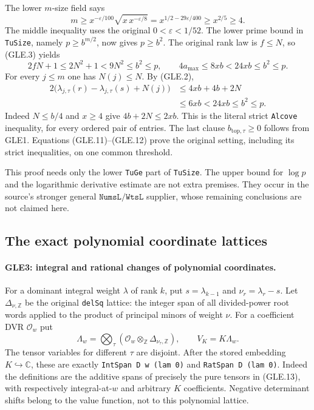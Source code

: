 The lower $m$-size field says
\[
 m\ge x^{-\varepsilon/100}\sqrt{x\,x^{-\varepsilon/8}}
   =x^{1/2-29\varepsilon/400}\ge x^{2/5}\ge4.
 \tag{GLE.10}
\]
The middle inequality uses the original $0<\varepsilon<1/52$.
The lower prime bound in \texttt{TuSize}, namely
$p\ge b^{m/2}$, now gives $p\ge b^2$.
The original rank law is $f\le N$, so (GLE.3) yields
\[
 2fN+1\le2N^2+1<9N^2\le b^2\le p,
 \qquad 4a_{\max}\le8xb<24xb\le b^2\le p.
 \tag{GLE.11}
\]
For every $j\le m$ one has $N(j)\le N$.  By (GLE.2),
\[
 \begin{split}
 2\bigl(\lambda_{j,\tau}(r)-\lambda_{j,\tau}(s)+N(j)\bigr)
 &\le4xb+4b+2N\\
 &\le6xb<24xb\le b^2\le p.
 \end{split}                                      \tag{GLE.12}
\]
Indeed $N\le b/4$ and $x\ge4$ give $4b+2N\le2xb$.
This is the literal strict \texttt{Alcove} inequality, for every ordered
pair of entries.  The last clause $b_{\mathrm{top},\tau}\ge0$ follows
from GLE1.  Equations (GLE.11)--(GLE.12) prove the original setting,
including its strict inequalities, on one common threshold.

This proof needs only the lower \texttt{TuGe} part of \texttt{TuSize}.
The upper bound for $\log p$ and the logarithmic derivative estimate
are not extra premises.  They occur in the source's stronger general
$\texttt{NumsL}/\texttt{WtsL}$ supplier, whose remaining conclusions
are not claimed here.

\subsection{The exact polynomial coordinate lattices}

\paragraph{GLE3: integral and rational changes of polynomial coordinates.}
\label{claim:GLE3}
For a dominant integral weight $\lambda$ of rank $k$, put
$s=\lambda_{k-1}$ and $\nu_r=\lambda_r-s$.  Let
$\Delta_{\nu,\mathbb Z}$ be the original \texttt{delSq} lattice: the
integer span of all divided-power root words applied to the product of
principal minors of weight $\nu$.  For a coefficient DVR $\mathcal O_w$
put
\[
 \Lambda_w=\bigotimes_\tau
       (\mathcal O_w\otimes_{\mathbb Z}\Delta_{\nu_\tau,\mathbb Z}),
 \qquad V_K=K\Lambda_w.
 \tag{GLE.13}
\]
The tensor variables for different $\tau$ are disjoint.  After the
stored embedding $K\hookrightarrow\mathbb C$, these are exactly
\texttt{IntSpan D w (lam 0)} and \texttt{RatSpan D (lam 0)}.
Indeed the definitions are the additive spans of precisely the pure
tensors in (GLE.13), with respectively integral-at-$w$ and arbitrary
$K$ coefficients.  Negative determinant shifts belong to the value
function, not to this polynomial lattice.

